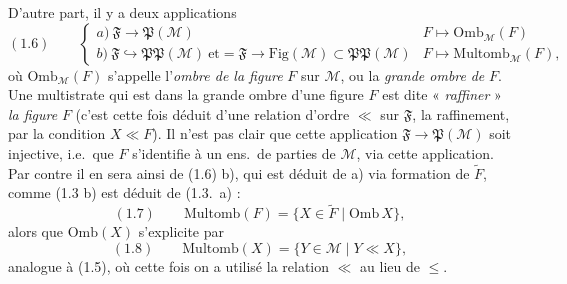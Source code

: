 \documentclass[11pt,a4paper]{article}
\begin{document}
D'autre part, il y a deux  applications
\[
  (1.6) \qquad
  \begin{cases}
    a)\ \mathfrak{F} \to \mathfrak{P}(\mathcal{M}) & F \mapsto \mathrm{Omb}_{\mathcal{M}}(F) \\
    b)\ \mathfrak{F} \hookrightarrow \mathfrak{P}\mathfrak{P}(\mathcal{M}) \ \text{et} = \mathfrak{F} \to \mathrm{Fig}(\mathcal{M}) \subset \mathfrak{P}\mathfrak{P}(\mathcal{M}) & F \mapsto \mathrm{Multomb}_{\mathcal{M}}(F) ,
  \end{cases}
\]
où $\mathrm{Omb}_{\mathcal{M}}(F)$ s'appelle l'\emph{ombre de la figure} $F$ sur $\mathcal{M}$, ou la \emph{grande ombre} \emph{de} $F$. Une multistrate  qui est dans la grande ombre d'une figure $F$ est dite « \emph{raffiner} » \emph{la figure} $F$ (c'est cette fois déduit d'une relation d'ordre $\ll$ sur $\mathfrak{F}$, la raffinement, par la condition $X \ll F$). Il n'est pas clair que cette application $\mathfrak{F} \to \mathfrak{P}(\mathcal{M})$ soit injective, i.e.\ que $F$ s'identifie à un ens.\ de parties de $\mathcal{M}$, via cette application. Par contre il en sera ainsi de (1.6) b), qui est déduit de a) via  formation de $\widetilde{F}$, comme (1.3 b) est déduit de (1.3.\ a) :
\[
  (1.7) \qquad \mathrm{Multomb}(F) = \lbrace X \in \widetilde{F} \mid \mathrm{Omb}\, X \rbrace ,
\]
alors que $\mathrm{Omb}(X)$ s'explicite par
\[
  (1.8) \qquad \mathrm{Multomb}(X) = \lbrace Y \in \mathcal{M} \mid Y \ll X \rbrace ,
\]
analogue à (1.5), où cette fois on a utilisé la relation  $\ll$ au lieu de $\leq$. 
\end{document}
